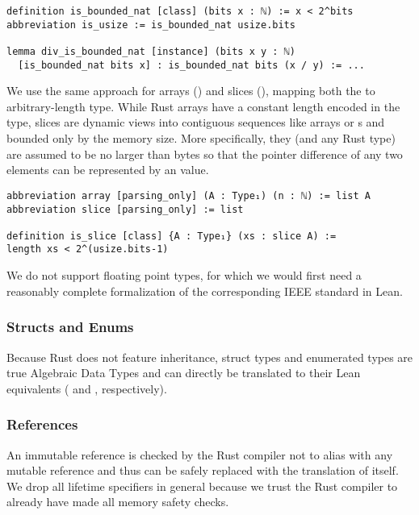 \begin{verbatim}
definition is_bounded_nat [class] (bits x : ℕ) := x < 2^bits
abbreviation is_usize := is_bounded_nat usize.bits

lemma div_is_bounded_nat [instance] (bits x y : ℕ)
  [is_bounded_nat bits x] : is_bounded_nat bits (x / y) := ...
\end{verbatim}

We use the same approach for arrays (\rust{[T; N]}) and slices (\rust{&[T]}),
mapping both the to arbitrary-length  type. While Rust arrays have a
constant length encoded in the type, slices are dynamic views into contiguous sequences
like arrays or s and bounded only by the memory size. More
specifically, they (and any Rust type) are assumed to be no larger than
 bytes so that the pointer difference of any two elements can
be represented by an  value.

\begin{verbatim}
abbreviation array [parsing_only] (A : Type₁) (n : ℕ) := list A
abbreviation slice [parsing_only] := list

definition is_slice [class] {A : Type₁} (xs : slice A) :=
length xs < 2^(usize.bits-1)
\end{verbatim}

We do not support floating point types, for which we would first need a
reasonably complete formalization of the corresponding IEEE standard in Lean.

\subsubsection{Structs and Enums}

Because Rust does not feature inheritance, struct types and enumerated types are
true Algebraic Data Types and can directly be translated to their Lean
equivalents ( and , respectively).

\subsubsection{References}
\label{sec:refs}

An immutable reference  is checked by the Rust compiler not to alias
with any mutable reference and thus can be safely replaced with the translation
of  itself. We drop all lifetime specifiers in general because we trust
the Rust compiler to already have made all memory safety checks.

